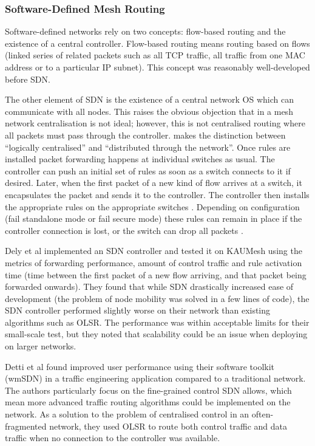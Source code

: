 \documentclass[pdftex,12pt,a4paper]{article}
\begin{document}
\subsubsection{Software-Defined Mesh Routing}
Software-defined networks rely on two concepts: flow-based routing and the existence of a central controller. Flow-based routing means routing based on flows (linked series of related packets such as all TCP traffic, all traffic from one MAC address or to a particular IP subnet). This concept was reasonably well-developed \cite{wellons:oblivious,wang:routing} before SDN.

The other element of SDN is the existence of a central network OS which can communicate with all nodes. This raises the obvious objection that in a mesh network centralisation is not ideal; however, this is not centralised routing where all packets must pass through the controller. \cite{handigol:asterix} makes the distinction between ``logically centralised'' and ``distributed through the network''. Once rules are installed packet forwarding happens at individual switches as usual. The controller can push an initial set of rules as soon as a switch connects to it if desired. Later, when the first packet of a new kind of flow arrives at a switch, it encapsulates the packet and sends it to the controller. The controller then installs the appropriate rules on the appropriate switches \cite{mckeown:sdn}. Depending on configuration (fail standalone mode or fail secure mode) these rules can remain in place if the controller connection is lost, or the switch can drop all packets \cite{onf:switch140}.

Dely et al \cite{dely:wmn} implemented an SDN controller and tested it on KAUMesh using the metrics of forwarding performance, amount of control traffic and rule activation time (time between the first packet of a new flow arriving, and that packet being forwarded onwards). They found that while SDN drastically increased ease of development (the problem of node mobility was solved in a few lines of code), the SDN controller performed slightly worse on their network than existing algorithms such as OLSR. The performance was within acceptable limits for their small-scale test, but they noted that scalability could be an issue when deploying on larger networks.

Detti et al \cite{detti:wmsdn} found improved user performance using their software toolkit (wmSDN) in a traffic engineering application compared to a traditional network. The authors particularly focus on the fine-grained control SDN allows, which mean more advanced traffic routing algorithms could be implemented on the network. As a solution to the problem of centralised control in an often-fragmented network, they used OLSR to route both control traffic and data traffic when no connection to the controller was available.
\end{document}
